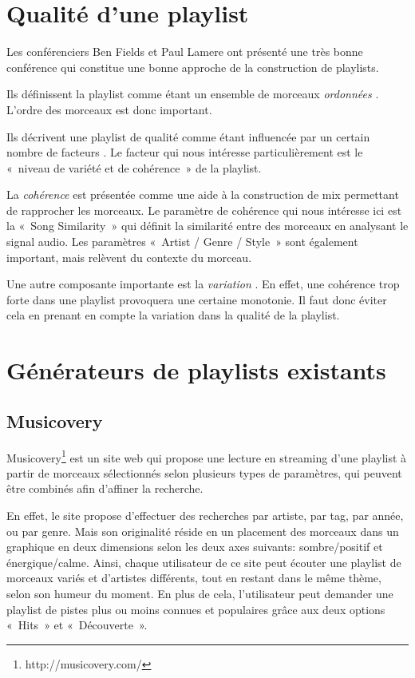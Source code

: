 
\section{Qualité d'une playlist}
\label{existant:qualite}

Les conférenciers Ben Fields et Paul Lamere ont présenté une très bonne
conférence \cite{ismir2010:playlist-tutorial} qui constitue une bonne approche
de la construction de playlists.

Ils définissent la playlist comme étant un ensemble de morceaux \emph{ordonnées}
\cite[p.~7]{ismir2010:playlist-tutorial}. L'ordre des morceaux est donc
important.

Ils décrivent une playlist de qualité comme étant influencée par un certain
nombre de facteurs \cite[p.~17--18]{ismir2010:playlist-tutorial}. Le facteur qui
nous intéresse particulièrement est le «~niveau de variété et de cohérence~» de
la playlist.

La \emph{cohérence} est présentée \cite[p.~21 -- 23]{ismir2010:playlist-tutorial}
comme une aide à la construction de mix permettant de rapprocher les morceaux.
Le paramètre de cohérence qui nous intéresse ici est la «~Song Similarity~» qui
définit la similarité entre des morceaux en analysant le signal audio.
Les paramètres «~Artist / Genre / Style~» sont également important, mais 
relèvent du contexte du morceau.

Une autre composante importante est la \emph{variation} 
\cite[p.~32]{ismir2010:playlist-tutorial}. En effet, une cohérence trop forte
dans une playlist provoquera une certaine monotonie. Il faut donc éviter cela
en prenant en compte la variation dans la qualité de la playlist.

\section{Générateurs de playlists existants}
\label{existant:generateurs}

\subsection{Musicovery}
\label{existant:generateurs:musicovery}

Musicovery\footnote{http://musicovery.com/} est un site web qui propose une 
lecture en streaming d'une playlist à partir de morceaux sélectionnés 
selon plusieurs types de paramètres, qui peuvent être combinés afin d'affiner 
la recherche.

En effet, le site propose d'effectuer des recherches par artiste, par tag, 
par année, ou par genre. Mais son originalité réside en un placement des 
morceaux dans un graphique en deux dimensions selon les deux axes suivants:
sombre/positif et énergique/calme.
Ainsi, chaque utilisateur de ce site peut écouter une playlist de morceaux 
variés et d'artistes différents, tout en restant dans le même thème, selon 
son humeur du moment.
En plus de cela, l'utilisateur peut demander une playlist de pistes plus 
ou moins connues et populaires grâce aux deux options «~Hits~» et «~Découverte~».

